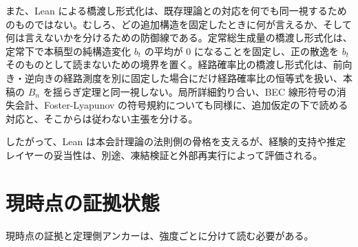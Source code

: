\documentclass[12pt,a4paper]{article}
\begin{document}
また、Lean による橋渡し形式化は、既存理論との対応を何でも同一視するためのものではない。むしろ、どの追加構造を固定したときに何が言えるか、そして何は言えないかを分けるための防御線である。定常総生成量の橋渡し形式化は、定常下で本稿型の純構造変化 \(b_{t}\) の平均が 0 になることを固定し、正の散逸を \(b_{t}\) そのものとして読まないための境界を置く。経路確率比の橋渡し形式化は、前向き・逆向きの経路測度を別に固定した場合にだけ経路確率比の恒等式を扱い、本稿の \(B_{n}\) を揺らぎ定理と同一視しない。局所詳細釣り合い、BEC 線形符号の消失会計、Foster-Lyapunov の符号規約についても同様に、追加仮定の下で読める対応と、そこからは従わない主張を分ける。

したがって、Lean は本会計理論の法則側の骨格を支えるが、経験的支持や推定レイヤーの妥当性は、別途、凍結検証と外部再実行によって評価される。

\section{現時点の証拠状態}\label{ux73feux6642ux70b9ux306eux8a3cux62e0ux72b6ux614b}

現時点の証拠と定理側アンカーは、強度ごとに分けて読む必要がある。
\end{document}
